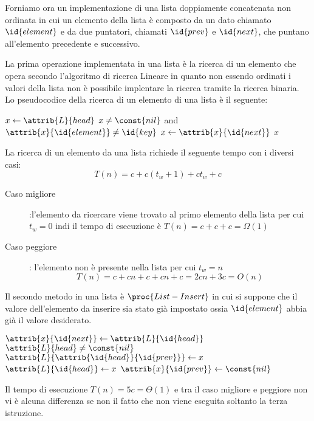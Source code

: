 Forniamo ora un implementazione di una lista doppiamente concatenata non ordinata
in cui un elemento della lista è composto da un dato chiamato $\id{element}$ e da due
puntatori, chiamati $\id{prev}$ e $\id{next}$, che puntano all'elemento precedente e successivo.

La prima operazione implementata in una lista è la ricerca di un elemento che opera
secondo l'algoritmo di ricerca Lineare in quanto non essendo ordinati i valori della lista
non è possibile implentare la ricerca tramite la ricerca binaria.
Lo pseudocodice della ricerca di un elemento di una lista è il seguente:
\begin{codebox}
\li $x\gets \attrib{L}{head}$
\li \While $x \neq \const{nil}$ and $\attrib{x}{\id{element}} \neq \id{key}$
    \Do
\li                      $x \gets \attrib{x}{\id{next}}$
    \End
\li \Return $x$
\end{codebox}
La ricerca di un elemento da una lista richiede il seguente tempo con i diversi casi:
\begin{equation*}
  T(n) = c + c(t_w + 1) + ct_w + c
\end{equation*}
\begin{description}
  \item[Caso migliore]:l'elemento da ricercare viene trovato al primo elemento della lista
        per cui $t_w = 0$ indi il tempo di esecuzione è $T(n) = c + c + c = \Omega(1)$
  \item[Caso peggiore]: l'elemento non è presente nella lista per cui $t_w = n$
        \begin{equation*}
          T(n) = c + cn + c + cn + c = 2cn + 3c = O(n)
        \end{equation*}
\end{description}

Il secondo metodo in una lista è $\proc{List-Insert}$ in cui si suppone che il valore
dell'elemento da inserire sia stato già impostato ossia $\id{element}$ abbia già il valore desiderato.
\begin{codebox}
\li $\attrib{x}{\id{next}} \gets \attrib{L}{\id{head}}$
\li \If $\attrib{L}{head} \neq \const{nil}$
    \Then
\li                       $\attrib{L}{\attrib{\id{head}}{\id{prev}}} \gets x$
    \End
\li $\attrib{L}{\id{head}} \gets x$
\li $\attrib{x}{\id{prev}} \gets \const{nil}$
\end{codebox}
Il tempo di esecuzione $T(n) = 5c = \Theta(1)$ e tra il caso migliore e peggiore non
vi è alcuna differenza se non il fatto che non viene eseguita soltanto la terza istruzione.

